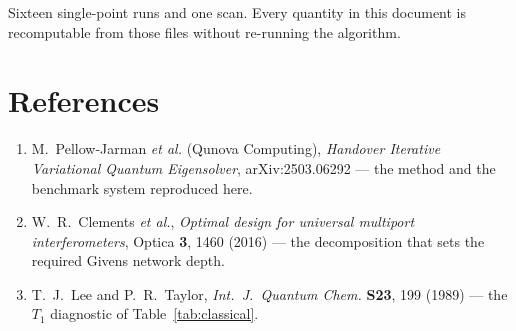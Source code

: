 \documentclass[11pt,a4paper]{article}
\begin{document}
Sixteen single-point runs and one scan. Every quantity in this document is
recomputable from those files without re-running the algorithm.

\section*{References}
\small
\begin{enumerate}[leftmargin=1.4em,itemsep=0.1em]
\item M.\ Pellow-Jarman \emph{et al.} (Qunova Computing), \emph{Handover
  Iterative Variational Quantum Eigensolver}, arXiv:2503.06292 --- the method
  and the benchmark system reproduced here.
\item W.\ R.\ Clements \emph{et al.}, \emph{Optimal design for universal
  multiport interferometers}, Optica \textbf{3}, 1460 (2016) --- the
  decomposition that sets the required Givens network depth.
\item T.\ J.\ Lee and P.\ R.\ Taylor, \emph{Int.\ J.\ Quantum Chem.}
  \textbf{S23}, 199 (1989) --- the $T_1$ diagnostic of
  Table~\ref{tab:classical}.
\end{enumerate}
\end{document}
